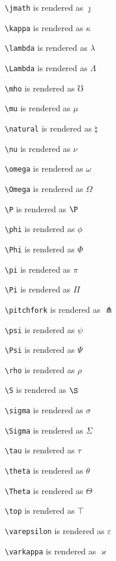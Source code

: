 \texttt{\textbackslash jmath} is rendered as $\jmath$


\texttt{\textbackslash kappa} is rendered as $\kappa$


\texttt{\textbackslash lambda} is rendered as $\lambda$


\texttt{\textbackslash Lambda} is rendered as $\Lambda$


\texttt{\textbackslash mho} is rendered as $\mho$


\texttt{\textbackslash mu} is rendered as $\mu$


\texttt{\textbackslash natural} is rendered as $\natural$


\texttt{\textbackslash nu} is rendered as $\nu$


\texttt{\textbackslash omega} is rendered as $\omega$


\texttt{\textbackslash Omega} is rendered as $\Omega$


\texttt{\textbackslash P} is rendered as $\P$


\texttt{\textbackslash phi} is rendered as $\phi$


\texttt{\textbackslash Phi} is rendered as $\Phi$


\texttt{\textbackslash pi} is rendered as $\pi$


\texttt{\textbackslash Pi} is rendered as $\Pi$


\texttt{\textbackslash pitchfork} is rendered as $\pitchfork$


\texttt{\textbackslash psi} is rendered as $\psi$


\texttt{\textbackslash Psi} is rendered as $\Psi$


\texttt{\textbackslash rho} is rendered as $\rho$


\texttt{\textbackslash S} is rendered as $\S$


\texttt{\textbackslash sigma} is rendered as $\sigma$


\texttt{\textbackslash Sigma} is rendered as $\Sigma$


\texttt{\textbackslash tau} is rendered as $\tau$


\texttt{\textbackslash theta} is rendered as $\theta$


\texttt{\textbackslash Theta} is rendered as $\Theta$


\texttt{\textbackslash top} is rendered as $\top$


\texttt{\textbackslash varepsilon} is rendered as $\varepsilon$


\texttt{\textbackslash varkappa} is rendered as $\varkappa$



